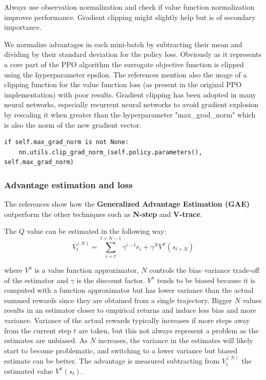 \documentclass[11pt, a4paper, hidelinks]{report}
\begin{document}
\begin{quoting}[font=itshape, begintext={"}, endtext={"\citep{ppo-implementation-2}}]
Always use observation normalization and check if value function normalization improves performance.
Gradient clipping might slightly help but is of secondary importance.
\end{quoting}

We normalize advantages in each mini-batch by subtracting their mean and dividing by their standard deviation for the policy loss.
Obviously as it represents a core part of the PPO algorithm the surrogate objective function is clipped using the hyperparameter epsilon.
The references mention also the usage of a clipping function for the value function loss (as present in the original PPO implementation) with poor results.
Gradient clipping has been adopted in many neural networks, especially recurrent neural networks to avoid gradient explosion by rescaling it when greater than the hyperparameter "max\_grad\_norm" which is also the norm of the new gradient vector.
\begin{lstlisting}[label={lst:gradient-clipping}]
if self.max_grad_norm is not None:
	nn.utils.clip_grad_norm_(self.policy.parameters(), self.max_grad_norm)
\end{lstlisting}

\subsubsection{Advantage estimation and loss}\label{subsubsec:advantage-estimation}

The references show how the \textbf{Generalized Advantage Estimation (GAE)} outperform the other techniques such as \textbf{N-step} and \textbf{V-trace}.

The $Q$ value can be estimated in the following way:
\begin{equation}
	V_t^{(N)} = \sum_{i = t}^{t + N - 1} \gamma^{i - t}r_i + \gamma^{N}V^{\pi}(s_{t + N})\label{eq:N-step}
\end{equation}

where $V^{\pi}$ is a value function approximator, $N$ controls the bias–variance trade-off of the estimator and $\gamma$ is the discount factor.
$V^{\pi}$ tends to be biased because it is computed with a function approximator but has lower variance than the actual summed rewards since they are obtained from a single trajectory.
Bigger $N$ values results in an estimator closer to empirical returns and induce less bias and more variance.
Variance of the actual rewards typically increases if more steps away from the current step $t$ are taken, but this not always represent a problem as the estimates are unbiased.
As $N$ increases, the variance in the estimates will likely start to become problematic, and switching to a lower variance but biased estimate can be better.
The advantage is measured subtracting from $V_t^{(N)}$ the estimated value $V^{\pi}(s_t)$.
\end{document}
